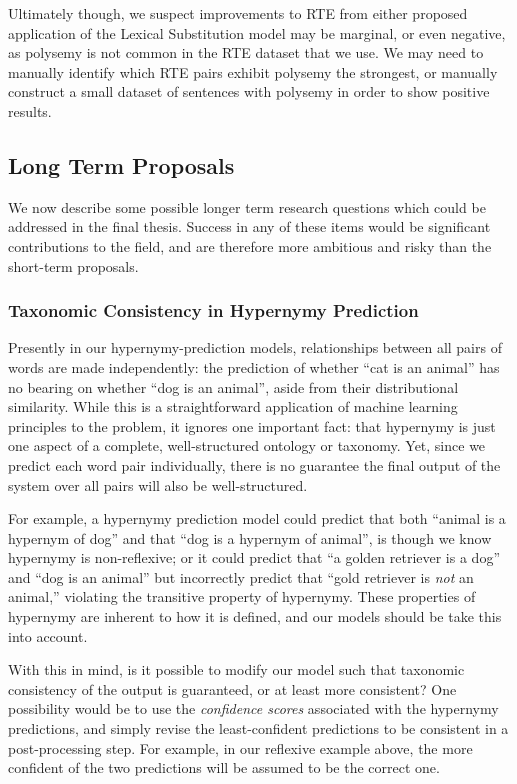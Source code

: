 \documentclass[12pt]{article}
\begin{document}
Ultimately though, we suspect improvements to RTE from either proposed
application of the Lexical Substitution model may be marginal, or even
negative, as polysemy is not common in the RTE dataset that we use. We may
need to manually identify which RTE pairs exhibit polysemy the strongest, or
manually construct a small dataset of sentences with polysemy in order to
show positive results.

\subsection{Long Term Proposals}

We now describe some possible longer term research questions which could be
addressed in the final thesis. Success in any of these items would
be significant contributions to the field, and are therefore more ambitious and
risky than the short-term proposals.

\subsubsection{Taxonomic Consistency in Hypernymy Prediction}

Presently in our hypernymy-prediction models, relationships between all
pairs of words are made independently: the prediction of whether ``cat is an
animal'' has no bearing on whether ``dog is an animal'', aside from their
distributional similarity. While this is a straightforward application of
machine learning principles to the problem, it ignores one important fact: that
hypernymy is just one aspect of a complete, well-structured ontology or
taxonomy. Yet, since we predict each word pair individually, there is no
guarantee the final output of the system over all pairs will also be
well-structured.

For example, a hypernymy prediction model could predict that both ``animal is a
hypernym of dog'' and that ``dog is a hypernym of animal'', is though we know
hypernymy is non-reflexive; or it could predict that ``a golden retriever is a
dog'' and ``dog is an animal'' but incorrectly predict that ``gold retriever is
{\em not} an animal,'' violating the transitive property of hypernymy. These
properties of hypernymy are inherent to how it is defined, and our models
should be take this into account.

With this in mind, is it possible to modify our model such that taxonomic
consistency of the output is guaranteed, or at least more consistent? One
possibility would be to use the {\em confidence scores} associated with the
hypernymy predictions, and simply revise the least-confident predictions to
be consistent in a post-processing step. For example, in our reflexive example
above, the more confident of the two predictions will be assumed to be
the correct one.
\end{document}
